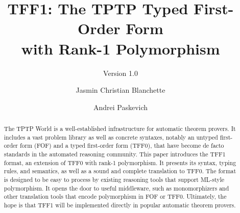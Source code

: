 \documentclass[a4paper]{llncs}
\begin{document}
\title{
TFF1: The TPTP Typed First-Order Form \\ with Rank-1
Polymorphism}
\subtitle{Version 1.0}

\author{
Jasmin Christian Blanchette \and
Andrei Paskevich
}


\maketitle

\begin{abstract}
The TPTP World is a well-established infrastructure for automatic theorem
provers. It includes a vast problem library as well as concrete syntaxes,
notably an untyped first-order form (FOF) and a typed first-order form (TFF0),
that have become de facto standards in the automated reasoning
community. This paper introduces the TFF1 format, an extension of TFF0 with
rank-1 polymorphism. It presents its syntax, typing rules, and semantics, as
well as a sound and complete translation to TFF0. The format is designed to be
easy to process by existing reasoning tools that support ML-style polymorphism.
It opens the door to useful middleware, such as monomorphizers and other
translation tools that encode polymorphism in FOF or TFF0. Ultimately, the hope
is that TFF1 will be implemented directly in popular automatic theorem provers.
\end{abstract}












\end{document}
